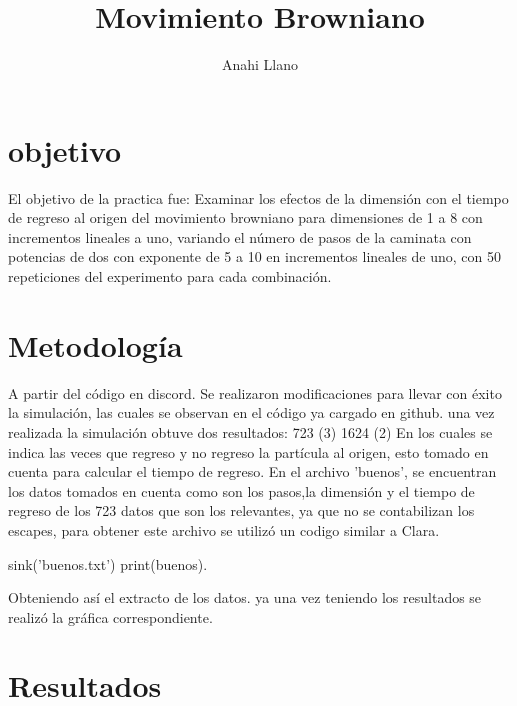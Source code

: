 \documentclass{article}
\title {Movimiento Browniano}
\author{Anahi Llano}
\begin{document}
\maketitle

\section{objetivo}\label{obj}

\cite{baz} El objetivo de la practica fue: Examinar los efectos de la dimensi\'on con el tiempo de regreso al origen del movimiento browniano para dimensiones de 1 a 8 con incrementos lineales a uno, variando el n\'umero de pasos de la caminata con potencias de dos con exponente de 5 a 10 en incrementos lineales de uno, con 50 repeticiones del experimento para cada combinaci\'on.

\section{Metodolog\'ia}\label{met}

\cite{elis} A partir del c\'odigo en discord. Se realizaron modificaciones para llevar con \'exito la simulaci\'on, las cuales se observan en el c\'odigo ya cargado en github.
una vez realizada la simulaci\'on obtuve dos resultados:
723  (3)
1624 (2)
En los cuales se indica las veces que regreso y no regreso la part\'icula al origen, esto tomado en cuenta para calcular el tiempo de regreso.
En el archivo 'buenos', se encuentran los datos tomados en cuenta como son los pasos,la dimensi\'on y el tiempo de regreso de los 723 datos que son los relevantes, ya que no se contabilizan los escapes, para obtener este archivo se utiliz\'o un codigo similar a Clara. 
\cite{clara}

sink('buenos.txt')  
print(buenos).

Obteniendo as\'i el extracto de los datos. ya una vez teniendo los resultados se realiz\'o la gr\'afica correspondiente.
 
\section{Resultados}\label{res}
\end{document}

